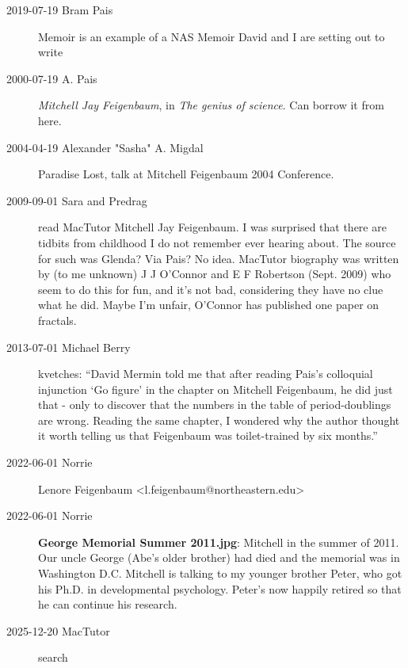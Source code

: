 \begin{description}
\item[2019-07-19 Bram Pais] 
{Memoir} is an example of a NAS Memoir David and I are setting out to
write

\item[2000-07-19 A. Pais]
{\em Mitchell Jay Feigenbaum}, in {\em The genius of science}.
Can borrow it from
 {here}.

\item[2004-04-19 Alexander "Sasha" A. Migdal]
 {Paradise Lost},
talk at Mitchell Feigenbaum 2004 Conference.

\item[2009-09-01 Sara and Predrag] read
 {MacTutor}
{Mitchell Jay Feigenbaum}.
I was surprised that there are tidbits from childhood I do not remember ever hearing about. 
The source for such was Glenda? Via Pais? No idea. MacTutor biography was written by (to me unknown) 
{J J O'Connor} and 
{E F Robertson} (Sept. 2009) who seem to do this for fun, and it's not bad, 
considering they have no clue what he did. 
Maybe I'm unfair, O'Connor has published  
 {one paper} on fractals.

\item[2013-07-01 Michael Berry]
{kvetches}: ``David Mermin told me that after reading Pais's colloquial
injunction `Go figure' in the chapter on Mitchell Feigenbaum, he did just
that - only to discover that the numbers in the table of period-doublings
are wrong. Reading the same chapter, I wondered why the author thought it
worth telling us that Feigenbaum was toilet-trained by six months.''

\item[2022-06-01 Norrie] Lenore Feigenbaum <l.feigenbaum@northeastern.edu>

\item[2022-06-01 Norrie]

\textbf{George Memorial Summer 2011.jpg}:
Mitchell in the summer of 2011.  Our uncle George (Abe's older brother) had
died and the memorial was in Washington D.C. Mitchell is talking to my
younger brother Peter, who got his Ph.D. in developmental psychology.
Peter's now happily retired so that he can continue his research.

\item[2025-12-20 {MacTutor}]
{search}


\end{description}



\printbibliography[heading=subbibintoc,title={References}]
